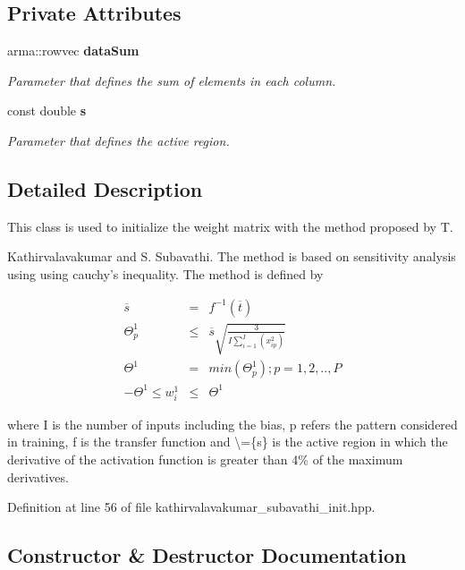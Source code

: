 \subsection*{Private Attributes}
\begin{DoxyCompactItemize}
\item 
arma\+::rowvec {\bf data\+Sum}
\begin{DoxyCompactList}\small\item\em Parameter that defines the sum of elements in each column. \end{DoxyCompactList}\item 
const double {\bf s}
\begin{DoxyCompactList}\small\item\em Parameter that defines the active region. \end{DoxyCompactList}\end{DoxyCompactItemize}


\subsection{Detailed Description}
This class is used to initialize the weight matrix with the method proposed by T. 

Kathirvalavakumar and S. Subavathi. The method is based on sensitivity analysis using using cauchy’s inequality. The method is defined by

\begin{eqnarray*} \overline{s} &=& f^{-1}(\overline{t}) \\ \Theta^{1}_{p} &\le& \overline{s} \sqrt{\frac{3}{I \sum_{i = 1}^{I} (x_{ip}^2)}} \\ \Theta^1 &=& min(\Theta_{p}^{1}); p=1,2,..,P \\ -\Theta^{1} \le w_{i}^{1} &\le& \Theta^{1} \end{eqnarray*}

where I is the number of inputs including the bias, p refers the pattern considered in training, f is the transfer function and \textbackslash{}=\{s\} is the active region in which the derivative of the activation function is greater than 4\% of the maximum derivatives. 

Definition at line 56 of file kathirvalavakumar\+\_\+subavathi\+\_\+init.\+hpp.



\subsection{Constructor \& Destructor Documentation}
